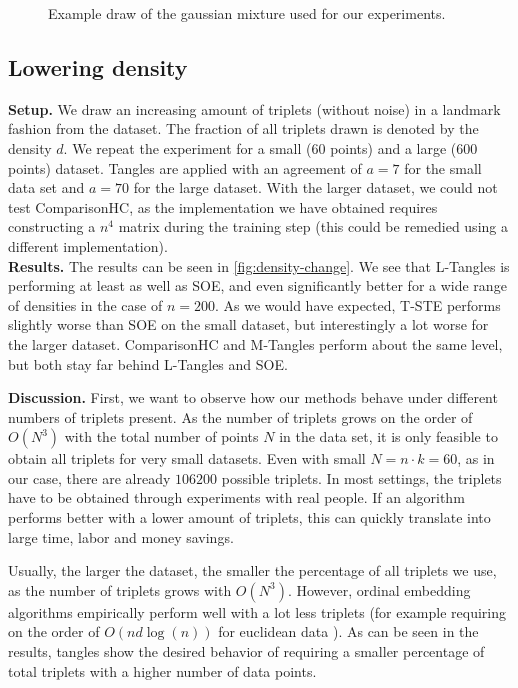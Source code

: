 \begin{figure}[ht]
    \centering
    \resizebox{0.8\textwidth}{!}{}
    \caption{Example draw of the gaussian mixture used for our experiments.}
    \label{fig:dataset-gauss}
\end{figure}

\subsection{Lowering density}\label{sec:lower-density}

\textbf{Setup.} 
We draw an increasing amount of triplets (without noise) in a landmark fashion from the dataset. 
The fraction of all triplets drawn is denoted by the density $d$.  We repeat the experiment for a small ($60$ points) and a large ($600$ points) dataset.
Tangles are applied with an agreement of $a=7$ for the small data set and $a=70$ for the large dataset.
With the larger dataset, we could not test ComparisonHC, as the implementation we have obtained requires 
constructing a $n^4$ matrix during the training step (this could be remedied using a different implementation). \\

\noindent
\textbf{Results.} The results can be seen in \autoref{fig:density-change}.
We see that L-Tangles is performing at least as well as SOE, and even significantly better for a wide range of densities in the case of $n=200$. 
As we would have expected, T-STE performs slightly worse than SOE on the small dataset, but interestingly a lot worse for the larger dataset. ComparisonHC and M-Tangles
perform about the same level, but both stay far behind L-Tangles and SOE. 

\noindent
\textbf{Discussion.}
First, we want to observe how our methods behave under different numbers of triplets present. 
As the number of triplets grows on the order of $O(N^3)$ with the total number of points $N$ in the data set, it is only feasible to obtain
all triplets for very small datasets. Even with small $N = n \cdot k = 60$, as in our case, there are already $106200$ possible triplets. In most settings, the triplets have to be obtained 
through experiments with real people. If an algorithm performs better with a lower amount
of triplets, this can quickly translate into large time, labor and money savings. 

Usually, the larger the dataset, the smaller the percentage of all triplets we use, as the number of triplets grows with $O(N^3)$. 
However, ordinal embedding algorithms empirically perform well with a lot
less triplets (for example requiring on the order of $O(n d \log(n))$ for euclidean data \citep{jainFiniteSamplePrediction2016}). 
As can be seen in the results, tangles show the desired behavior of requiring a smaller percentage of total triplets with a higher number of data points.

